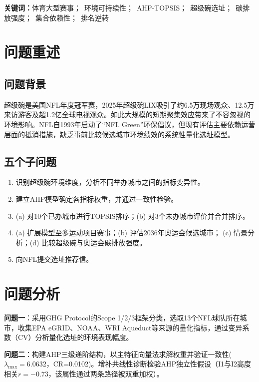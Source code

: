 \documentclass[12pt]{ctexart}
\begin{document}
\vspace{1em}
\noindent\textbf{关键词：}\quad 体育大型赛事；\ 环境可持续性；\ AHP-TOPSIS；\ 超级碗选址；\ 碳排放强度；\ 集合依赖性；\ 排名逆转
\newpage

\tableofcontents
\newpage

\section{问题重述}\label{sec:restate}

\subsection{问题背景}
超级碗是美国NFL年度冠军赛，2025年超级碗LIX吸引了约6.5万现场观众、12.5万来访游客及超1.2亿全球电视观众\cite{NFLGreen}。如此大规模的短期聚集效应带来了不容忽视的环境影响。NFL自1993年启动了``NFL Green''环保倡议，但现有评估主要依赖运营层面的抵消措施，缺乏事前比较候选城市环境绩效的系统性量化选址模型。

\subsection{五个子问题}
\begin{enumerate}[label=(\arabic*),itemsep=0.2em]
  \item 识别超级碗环境维度，分析不同举办城市之间的指标变异性。
  \item 建立AHP模型确定各指标权重，并通过一致性检验。
  \item (a) 对10个已办城市进行TOPSIS排序；(b) 对3个未办城市评价并合并排序。
  \item (a) 扩展模型至多运动项目赛事；(b) 评估2036年奥运会候选城市；
        (c) 情景分析；(d) 比较超级碗与奥运会碳排放强度。
  \item 向NFL提交选址推荐信。
\end{enumerate}

\section{问题分析}\label{sec:analysis}

\textbf{问题一}：采用GHG Protocol的Scope 1/2/3框架分类，选取13个NFL球队所在城市，收集EPA eGRID、NOAA、WRI Aqueduct等来源的量化指标，通过变异系数（CV）分析量化选址的环境表现幅度。

\textbf{问题二}：构建AHP三级递阶结构，以主特征向量法求解权重并验证一致性($\lambda_{\max}=6.0632$，CR=0.0102)。增补共线性诊断检验AHP独立性假设（I1与I2高度相关$r=-0.73$，该属性通过两条路径被双重加权）。
\end{document}
